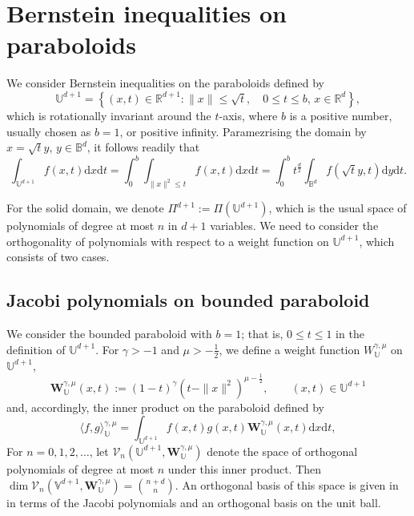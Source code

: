 \documentclass{amsart}
\theoremstyle{remark}
\def\la{{\langle}}
\def\ra{{\rangle}}
\def\d{\mathrm{d}}
\def\a{{\alpha}}
\def\g{{\gamma}}
\def\la{{\langle}}
\def\ra{{\rangle}}
\def\bb{{\mathbf b}}
\def\Wb{{\mathbf W}}
\def\CV{{\mathcal V}}
\def\BB{{\mathbb B}}
\def\RR{{\mathbb R}}
\def\UU{{\mathbb U}}
\def\VV{{\mathbb V}}
\def\f{\frac}
\begin{document}
\section{Bernstein inequalities on paraboloids}
\setcounter{equation}{0}

We consider Bernstein inequalities on the paraboloids defined by 
$$
  \UU^{d+1} = \left\{(x,t) \in \RR^{d+1}: \|x\| \le \sqrt{t}, \quad 0 \le t \le b, \, x \in \RR^d \right\},
$$
which is rotationally invariant around the $t$-axis, where $b$ is a positive number, usually 
chosen as $b =1$, or positive infinity. Paramezrising the domain by $x =\sqrt{t} y$, $y\in \BB^d$, it follows readily that 
\begin{equation}\label{intUU=}
  \int_{\UU^{d+1} } f(x,t) \d x \d t  = \int_0^b \int_{\|x\|^2 \le t} f(x,t) \d x \d t =
    \int_0^b t^{\frac{d}{2}} \int_{\BB^d} f\left(\sqrt{t} y, t\right) \d y \d t. 
\end{equation}

For the solid domain, we denote $\Pi^{d+1}:= \Pi(\UU^{d+1})$, which is the usual space of polynomials
of degree at most $n$ in $d+1$ variables. We need to consider the orthogonality of polynomials with 
respect to a weight function on $\UU^{d+1}$, which consists of two cases.  

\subsection{Jacobi polynomials on bounded paraboloid} 
We consider the bounded paraboloid with $b =1$; that is, $0 \le t \le 1$ in the definition of $\UU^{d+1}$.  
For $\g > -1$ and $\mu> -\f12$,  we define a weight function $W_\UU^{\g,\mu}$ on $\UU^{d+1}$,
$$
    \Wb_\UU^{\g,\mu}(x,t) :=  (1-t)^\g (t - \|x\|^2)^{\mu-\f12}, \qquad  (x,t) \in \UU^{d+1} 
$$
and, accordingly, the inner product on the paraboloid defined by 
$$
  \la f,g\ra_\UU^{\g,\mu} = \int_{\UU^{d+1}} f(x,t) g(x,t) \Wb_\UU^{\g,\mu}(x,t) \d x\d t,
$$
For $n =0,1,2,\ldots$, let $\CV_n(\UU^{d+1},\Wb_\UU^{\g,\mu})$ denote the space of orthogonal polynomials 
of degree at most $n$ under this inner product. Then $\dim \CV_n(\VV^{d+1}, \Wb_\UU^{\g,\mu}) = \binom{n+d}{n}$. 
An orthogonal basis of this space is given in \cite{OX, X23a} in terms of the Jacobi polynomials and an 
orthogonal basis on the unit ball. 
\end{document}
